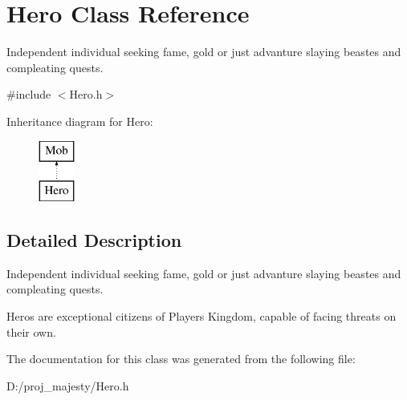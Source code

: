\hypertarget{class_hero}{}\section{Hero Class Reference}
\label{class_hero}


Independent individual seeking fame, gold or just advanture slaying beastes and compleating quests.  




{\ttfamily \#include $<$Hero.\+h$>$}

Inheritance diagram for Hero\+:\begin{figure}[H]
\begin{center}
\leavevmode
\includegraphics[height=2.000000cm]{class_hero}
\end{center}
\end{figure}


\subsection{Detailed Description}
Independent individual seeking fame, gold or just advanture slaying beastes and compleating quests. 

Heros are exceptional citizens of Player\textquotesingle{}s Kingdom, capable of facing threats on their own. 

The documentation for this class was generated from the following file\+:\begin{DoxyCompactItemize}
\item 
D\+:/proj\+\_\+majesty/Hero.\+h\end{DoxyCompactItemize}
